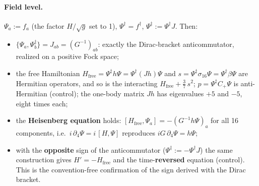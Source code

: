 \paragraph{Field level.} $\Psi_a:=f_a$ (the factor $H/\sqrt g$ set to 1), $\Psi^{\dagger}=f^{\dagger}$,
$\Psi^{\ddagger}:=\Psi^{\dagger}J$. Then:
\begin{itemize}
  \item $\{\Psi_a,\Psi^{\ddagger}_b\}=J_{ab}=(G^{-1})_{ab}$: exactly the Dirac-bracket anticommutator,
        realized on a positive Fock space;
  \item the free Hamiltonian $H_{\mathrm{free}}=\Psi^{\ddagger}h\Psi=\Psi^{\dagger}(Jh)\Psi$ and
        $s=\Psi^{\ddagger}\sigma_{16}\Psi=\Psi^{\dagger}\beta\Psi$ are Hermitian operators, and so is
        the interacting $H_{\mathrm{free}}+\tfrac37\,s^2$; $p=\Psi^{\ddagger}C_+\Psi$ is
        anti-Hermitian (control); the one-body matrix $Jh$ has eigenvalues $+5$ and $-5$, eight
        times each;
  \item the \textbf{Heisenberg equation} holds: $[H_{\mathrm{free}},\Psi_a]=-(G^{-1}h\Psi)_a$ for all
        16 components, i.e.\ $i\,\partial_4\Psi=i\,[H,\Psi]$ reproduces $iG\,\partial_4\Psi=h\Psi$;
  \item with the \textbf{opposite} sign of the anticommutator ($\Psi^{\ddagger}:=-\Psi^{\dagger}J$)
        the same construction gives $H'=-H_{\mathrm{free}}$ and the time-\textbf{reversed} equation
        (control). This is the convention-free confirmation of the sign derived with the Dirac
        bracket.
\end{itemize}

